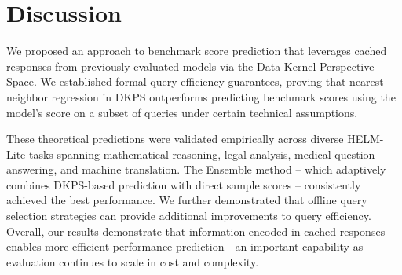 
\section{Discussion}
We proposed an approach to benchmark score prediction that leverages cached responses from previously-evaluated models via the Data Kernel Perspective Space.
We established formal query-efficiency guarantees, proving that nearest neighbor regression in DKPS outperforms predicting benchmark scores using the model's score on a subset of queries under certain technical assumptions.

These theoretical predictions were validated empirically across diverse HELM-Lite tasks spanning mathematical reasoning, legal analysis, medical question answering, and machine translation.
The Ensemble method -- which adaptively combines DKPS-based prediction with direct sample scores -- consistently achieved the best performance.
We further demonstrated that offline query selection strategies can provide additional improvements to query efficiency.
Overall, our results demonstrate that information encoded in cached responses enables more efficient performance prediction—an important capability as evaluation continues to scale in cost and complexity.

